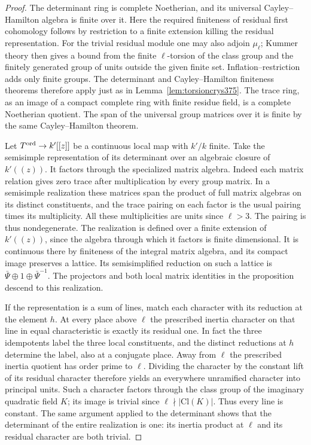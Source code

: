 \documentclass[a4paper,11pt]{article}
\theoremstyle{definition}
\theoremstyle{remark}
\numberwithin{equation}{section}
\begin{document}
\begin{proof}
The determinant ring is complete Noetherian, and its universal
Cayley--Hamilton algebra is finite over it. Here the
required finiteness of residual first cohomology follows by
restriction to a finite extension killing the residual
representation. For the trivial residual module one may also
adjoin \(\mu_\ell\); Kummer theory then gives a bound from the
finite \(\ell\)-torsion of the class group and the finitely
generated group of units outside the given finite set.
Inflation--restriction adds only finite groups. The determinant
and Cayley--Hamilton finiteness theorems therefore apply just
as in Lemma~\ref{lem:torsioncrys375}. The trace ring, as an
image of a compact complete ring with finite residue field,
is a complete Noetherian quotient. The span of the universal
group matrices over it is finite by the same Cayley--Hamilton
theorem.~\cite{XI-VIII-chenevier364}

Let \(T^{\rm ord}\to k'[[z]]\) be a continuous local map with
\(k'/k\) finite. Take the semisimple representation of its
determinant over an algebraic closure of \(k'((z))\).
It factors through the specialized matrix algebra. Indeed
each matrix relation gives zero trace after multiplication
by every group matrix. In a semisimple realization these
matrices span the product of full matrix algebras on its
distinct constituents, and the trace pairing on each factor
is the usual pairing times its multiplicity. All these
multiplicities are units since \(\ell>3\). The pairing is
thus nondegenerate. The realization is defined over a finite
extension of \(k'((z))\), since the algebra through which it
factors is finite dimensional. It is continuous there by
finiteness of the integral matrix algebra, and its compact
image preserves a lattice. Its semisimplified reduction on
such a lattice is \( \bar\Psi\oplus1\oplus\bar\Psi^{-1}\).
The projectors and both local matrix identities in the
proposition descend to this realization.

If the representation is a sum of lines, match each character
with its reduction at the element \(h\). At every place above
\(\ell\) the prescribed inertia character on that line in
equal characteristic is exactly its residual one. In fact
the three idempotents label the three local constituents, and
the distinct reductions at \(h\) determine the label, also
at a conjugate place. Away from \(\ell\) the prescribed
inertia quotient has order prime to \(\ell\). Dividing the
character by the constant lift of its residual character
therefore yields an everywhere unramified character into
principal units. Such a character factors through the class
group of the imaginary quadratic field \(K\); its image is
trivial since \(\ell\nmid|\mathrm{Cl}(K)|\). Thus every line
is constant. The same argument applied to the determinant
shows that the determinant of the entire realization is one:
its inertia product at \(\ell\) and its residual character are
both trivial.


\end{proof}
\end{document}
